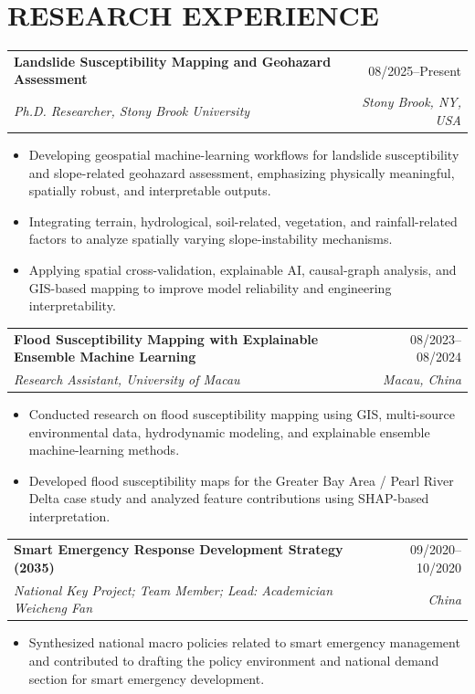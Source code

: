 \documentclass[10pt,letterpaper]{article}
\makeatletter
\newcommand{\cvsubheading}[4]{%
  \begin{tabularx}{\textwidth}{@{}X r@{}}
    \textbf{#1} & #3 \\
    \textit{#2} & \textit{#4} \\
  \end{tabularx}\vspace{-3pt}
}
\makeatother
\begin{document}
\section*{RESEARCH EXPERIENCE}
\cvsubheading{Landslide Susceptibility Mapping and Geohazard Assessment}{Ph.D. Researcher, Stony Brook University}{08/2025--Present}{Stony Brook, NY, USA}
\begin{itemize}
    \item Developing geospatial machine-learning workflows for landslide susceptibility and slope-related geohazard assessment, emphasizing physically meaningful, spatially robust, and interpretable outputs.
    \item Integrating terrain, hydrological, soil-related, vegetation, and rainfall-related factors to analyze spatially varying slope-instability mechanisms.
    \item Applying spatial cross-validation, explainable AI, causal-graph analysis, and GIS-based mapping to improve model reliability and engineering interpretability.
\end{itemize}

\cvsubheading{Flood Susceptibility Mapping with Explainable Ensemble Machine Learning}{Research Assistant, University of Macau}{08/2023--08/2024}{Macau, China}
\begin{itemize}
    \item Conducted research on flood susceptibility mapping using GIS, multi-source environmental data, hydrodynamic modeling, and explainable ensemble machine-learning methods.
    \item Developed flood susceptibility maps for the Greater Bay Area / Pearl River Delta case study and analyzed feature contributions using SHAP-based interpretation.
\end{itemize}

\cvsubheading{Smart Emergency Response Development Strategy (2035)}{National Key Project; Team Member; Lead: Academician Weicheng Fan}{09/2020--10/2020}{China}
\begin{itemize}
    \item Synthesized national macro policies related to smart emergency management and contributed to drafting the policy environment and national demand section for smart emergency development.
\end{itemize}
\end{document}
